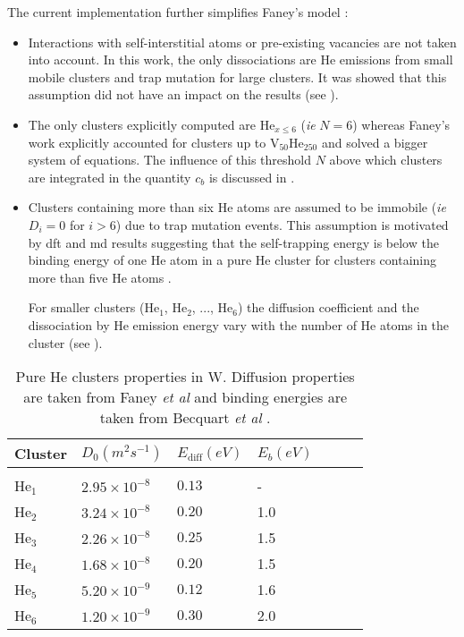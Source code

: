 The current implementation further simplifies Faney's model :
\begin{itemize}
    \item Interactions with \gls{self-interstitial} atoms or pre-existing vacancies are not taken into account.
    In this work, the only dissociations are He emissions from small mobile clusters and \gls{trap mutation} for large clusters.
    It was showed that this assumption did not have an impact on the results (see ).
    \item The only clusters explicitly computed are $\mathrm{He}_{x \leq 6}$ (\textit{ie} $N=6$) whereas Faney's work explicitly accounted for clusters up to $\mathrm{V}_{50}\mathrm{He}_{250}$ and solved a bigger system of equations.
    The influence of this threshold $N$ above which clusters are integrated in the quantity $c_b$ is discussed in .
    \item Clusters containing more than six He atoms are assumed to be immobile (\textit{ie} $D_i = 0$ for $i>6$) due to \gls{trap mutation} events.
    This assumption is motivated by \gls{dft} and \gls{md} results suggesting that the \gls{self-trapping} energy is below the binding energy of one He atom in a pure He cluster for clusters containing more than five He atoms .

    For smaller clusters ($\mathrm{He}_1$, $\mathrm{He}_2$, ..., $\mathrm{He}_6$) the diffusion coefficient and the dissociation by He emission energy vary with the number of He atoms in the cluster (see ).
\end{itemize}

\begin{table}
    \centering
    \begin{tabular}{L{1cm} R{2cm} R{1.6cm} R{1.1cm} R{1.6cm} R{1.1cm} R{2cm}}
        Cluster & $D_0 (\si{m^2 s^{-1}})$  & $E_\mathrm{diff} (\si{eV})$ &  $E_b (\si{eV})$   \\
        \hline
        \\
        He$_1$ & $2.95\times 10^{-8}$ & $0.13$ & - \\
        He$_2$ & $3.24\times 10^{-8}$ & $0.20$ & 1.0\\
        He$_3$ & $2.26\times 10^{-8}$ & $0.25$ & 1.5\\
        He$_4$ & $1.68\times 10^{-8}$ & $0.20$ & 1.5\\
        He$_5$ & $5.20\times 10^{-9}$ & $0.12$ & 1.6\\
        He$_6$ & $1.20\times 10^{-9}$ & $0.30$ & 2.0\\
    \end{tabular}
    \caption{Pure He clusters properties in W. Diffusion properties are taken from Faney \textit{et al} \cite{faney_spatially_2015} and binding energies are taken from Becquart \textit{et al} \cite{becquart_microstructural_2010}.}
\end{table}


